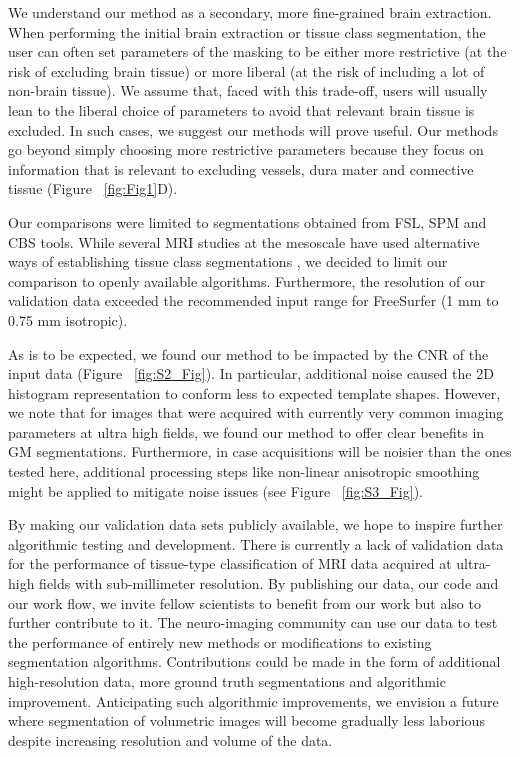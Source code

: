 We understand our method as a secondary, more fine-grained brain extraction. When performing the initial brain extraction or tissue class segmentation, the user can often set parameters of the masking to be either more restrictive (at the risk of excluding brain tissue) or more liberal (at the risk of including a lot of non-brain tissue). We assume that, faced with this trade-off, users will usually lean to the liberal choice of parameters to avoid that relevant brain tissue is excluded. In such cases, we suggest our methods will prove useful. Our methods go beyond simply choosing more restrictive parameters because they focus on information that is relevant to excluding vessels, dura mater and connective tissue (Figure ~\ref{fig:Fig1}D).

Our comparisons were limited to segmentations obtained from FSL, SPM and CBS tools. While several MRI studies at the mesoscale have used alternative ways of establishing tissue class segmentations \parencite{Fischl2004, Goebel2006}, we decided to limit our comparison to openly available algorithms. Furthermore, the resolution of our validation data exceeded the recommended input range for FreeSurfer (1 mm to 0.75 mm isotropic).

As is to be expected, we found our method to be impacted by the CNR of the input data (Figure ~\ref{fig:S2_Fig}). In particular, additional noise caused the 2D histogram representation to conform less to expected template shapes. However, we note that for images that were acquired with currently very common imaging parameters at ultra high fields, we found our method to offer clear benefits in GM segmentations. Furthermore, in case acquisitions will be noisier than the ones tested here, additional processing steps like non-linear anisotropic smoothing \parencite{Weickert1998, Mirebeau2015} might be applied to mitigate noise issues (see Figure ~\ref{fig:S3_Fig}).

By making our validation data sets publicly available, we hope to inspire further algorithmic testing and development. There is currently a lack of validation data for the performance of tissue-type classification of MRI data acquired at ultra-high fields with sub-millimeter resolution. By publishing our data, our code and our work flow, we invite fellow scientists to benefit from our work but also to further contribute to it. The neuro-imaging community can use our data to test the performance of entirely new methods or modifications to existing segmentation algorithms. Contributions could be made in the form of additional high-resolution data, more ground truth segmentations and algorithmic improvement. Anticipating such algorithmic improvements, we envision a future where segmentation of volumetric images will become gradually less laborious despite increasing resolution and volume of the data.

